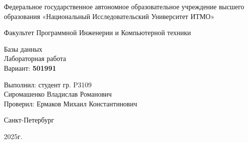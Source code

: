 \begin{center}
	Федеральное государственное автономное образовательное учреждение высшего образования «Национальный Исследовательский Университет ИТМО»
	
	\vspace{1em}
	Факультет Программной Инженерии и Компьютерной техники
	
	\vspace{20em}
	
	{\Large Базы данных}\\[1em]
	{\Large Лабораторная работа }\\[1em]
	Вариант: \textbf{501991}
\end{center}

\vspace{12em}

\begin{flushright}
	Выполнил:
	студент гр. P3109\\
	Сиромашенко Владислав Романович\\
	Проверил:
	Ермаков Михаил Константинович
\end{flushright}
\vspace{9em}
\vspace{\fill}

\begin{center}
	Санкт-Петербург
	
	2025г.
\end{center}
